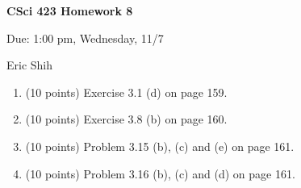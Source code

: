 \documentclass[11pt]{article}
\begin{document}
\begin{LARGE}
\centerline {\bf CSci 423 Homework 8}
\end{LARGE}
\vskip 0.25cm

\centerline{Due: 1:00 pm, Wednesday, 11/7}
\centerline{Eric Shih}

\begin{enumerate}
  \item (10 points) Exercise 3.1 (d) on page 159.
  \item (10 points) Exercise 3.8 (b) on page 160.
  \item (10 points) Problem 3.15 (b), (c) and (e) on page 161.
  \item (10 points) Problem 3.16 (b), (c) and (d) on page 161. 
\end{enumerate}
\end{document}
